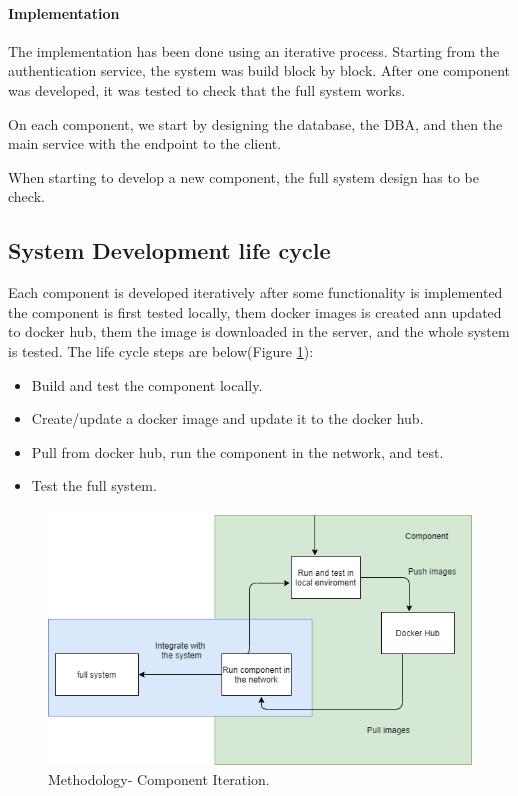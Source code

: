 \paragraph{ Implementation}

The implementation has been done using an iterative process. Starting from the authentication service, the system was build block by block. After one component was developed, it was tested to check that the full system works. 

On each component, we start by designing the database, the DBA, and then the main service with the endpoint to the client.

When starting to develop a new component, the full system design has to be check.


\subsection{System Development life cycle}
\indent
\indent
Each component is developed iteratively after some functionality is implemented the component is first tested locally, them docker images is created ann updated to docker hub, them the image is downloaded in the server, and the whole system is tested. The life cycle steps are below(Figure \ref{methodology:cycle}):

\begin{itemize}
	\item Build and test the component locally.
	\item Create/update a docker image and update it to the docker hub.
	\item Pull from docker hub, run the component in the network, and test.
	\item Test the full system. 
\end{itemize}


\begin{figure}
	\begin{center}
		\includegraphics[width=120mm,scale=1]{img/metodology/component-teration.png}
		\caption{Methodology- Component Iteration.}
		\label{methodology:cycle}
	\end{center}
	
\end{figure}

